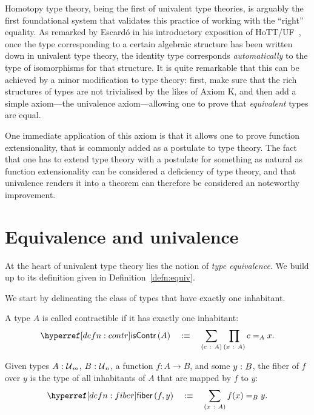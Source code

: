 Homotopy type theory, being the first of univalent type theories, is arguably the first
foundational system that validates this practice of working with the ``right'' equality.
As remarked by Escardó in his introductory exposition of HoTT/UF~\cite{escardo-uf-intro},
once the type corresponding to a certain algebraic structure has been written down in
univalent type theory, the identity type corresponds \emph{automatically} to the type of
isomorphisms for that structure. It is quite remarkable that this can be achieved by a
minor modification to type theory: first, make sure that the rich structures of types are
not trivialised by the likes of Axiom K, and then add a simple axiom---the univalence
axiom---allowing one to prove that \emph{equivalent} types are equal.

One immediate application of this axiom is that it allows one to prove function
extensionality, that is commonly added as a postulate to type theory. The fact that one
has to extend type theory with a postulate for something as natural as function
extensionality can be considered a deficiency of type theory, and that univalence renders
it into a theorem can therefore be considered an noteworthy improvement.

\section{Equivalence and univalence}

At the heart of univalent type theory lies the notion of \emph{type equivalence}. We build
up to its definition given in Definition~\ref{defn:equiv}.

We start by delineating the class of types that have exactly one inhabitant.
\begin{defn}[Contractible]\label{defn:contr}
  A type $A$ is called contractible if it has exactly one inhabitant:
  \begin{equation*}
    \iscontr{A} \quad\is\quad \sigmaty{c}{A}{\pity{x}{A}{c =_A x}}.
  \end{equation*}
\end{defn}

\begin{defn}[Fiber]\label{defn:fiber}
  Given types $A\hspace{0.1mm}:\hspace{0.1mm}\mathcal{U}{}_m$, $B\hspace{0.1mm}:\hspace{0.1mm}\mathcal{U}{}_n$, a function $f : A
  \rightarrow B$, and some $y\hspace{0.1mm}:\hspace{0.1mm}B$, the fiber of $f$ over $y$ is the type of all
  inhabitants of $A$ that are mapped by $f$ to $y$:
  \begin{equation*}
    \fiber{f}{y} \quad\is\quad \sigmaty{x}{A}{f(x) =_B y}.
  \end{equation*}
\end{defn}

